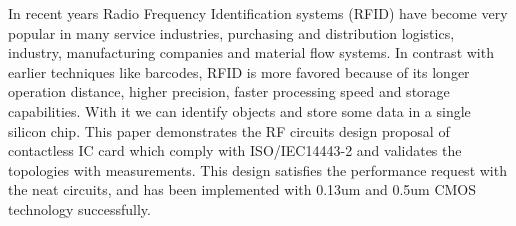 In recent years Radio Frequency Identification systems (RFID) \cite{rfid_handbook} have become very popular in many service industries, purchasing and distribution logistics, industry, manufacturing companies and material flow systems. In contrast with earlier techniques like barcodes, RFID is more favored because of its longer operation distance, higher precision, faster processing speed and storage capabilities. With it we can identify objects and store some data in a single silicon chip. This paper demonstrates the RF circuits design proposal of contactless IC card which comply with ISO/IEC14443-2 \cite{nfc_spec} and validates the topologies with measurements. This design satisfies the performance request with the neat circuits, and has been implemented with 0.13um and 0.5um CMOS technology successfully.